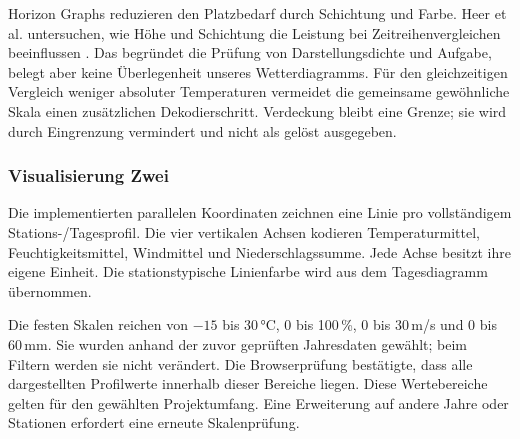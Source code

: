 \documentclass[usegeometry=true]{scrartcl}
\begin{document}
Horizon Graphs reduzieren den Platzbedarf durch Schichtung und Farbe.
Heer et al. untersuchen, wie Höhe und Schichtung die Leistung bei
Zeitreihenvergleichen beeinflussen \autocite{heer2009horizon}.
Das begründet die Prüfung von Darstellungsdichte und Aufgabe, belegt aber
keine Überlegenheit unseres Wetterdiagramms. Für den gleichzeitigen
Vergleich weniger absoluter Temperaturen vermeidet die gemeinsame
gewöhnliche Skala einen zusätzlichen Dekodierschritt. Verdeckung bleibt
eine Grenze; sie wird durch Eingrenzung vermindert und nicht als gelöst
ausgegeben.
\subsubsection{Visualisierung Zwei}
Die implementierten parallelen Koordinaten zeichnen eine Linie pro
vollständigem Stations-/Tagesprofil. Die vier vertikalen Achsen kodieren
Temperaturmittel, Feuchtigkeitsmittel, Windmittel und Niederschlagssumme.
Jede Achse besitzt ihre eigene Einheit. Die stationstypische Linienfarbe
wird aus dem Tagesdiagramm übernommen.

Die festen Skalen reichen von $-15$ bis 30\,°C, 0 bis 100\,\%,
0 bis 30\,m/s und 0 bis 60\,mm. Sie wurden anhand der zuvor geprüften
Jahresdaten gewählt; beim Filtern werden sie nicht verändert. Die
Browserprüfung bestätigte, dass alle dargestellten Profilwerte innerhalb
dieser Bereiche liegen. Diese Wertebereiche gelten für den gewählten
Projektumfang. Eine Erweiterung auf andere Jahre oder Stationen erfordert
eine erneute Skalenprüfung.
\end{document}

